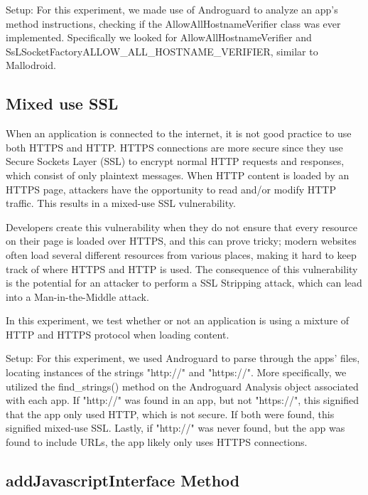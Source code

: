         Setup: For this experiment, we made use of Androguard to analyze an app's 
        method instructions, checking if the AllowAllHostnameVerifier class 
        was ever implemented. Specifically we looked for AllowAllHostnameVerifier and 
        SsLSocketFactory\;\-\>ALLOW\_ALL\_HOSTNAME\_VERIFIER, similar to Mallodroid.


    \subsection{Mixed use SSL}

        When an application is connected to the internet, it is not 
        good practice to use both HTTPS and HTTP. HTTPS connections 
        are more secure since they use Secure Sockets Layer (SSL) to 
        encrypt normal HTTP requests and responses, which consist of 
        only plaintext messages. When HTTP content is loaded by an 
        HTTPS page, attackers have the opportunity to read and/or modify
        HTTP traffic. This results in a mixed-use SSL vulnerability.

        Developers create this vulnerability when they do not ensure 
        that every resource on their page is loaded over HTTPS, and 
        this can prove tricky; modern websites often load several 
        different resources from various places, making it hard to 
        keep track of where HTTPS and HTTP is used. The consequence of this vulnerability 
        is the potential for an attacker to perform a SSL Stripping attack, which can lead into a Man-in-the-Middle 
        attack.

        In this experiment, we test whether or not an application is 
        using a mixture of HTTP and HTTPS protocol when loading content.

        Setup: For this experiment, we used Androguard to parse through the apps' 
        files, locating instances of the strings "http://" and "https://". 
        More specifically, we utilized the find\_strings() method on the Androguard 
        Analysis object associated with each app. If "http://" was found in an app, but not "https://", this signified 
        that the app only used HTTP, which is not secure. If both were found, 
        this signified mixed-use SSL. Lastly, if "http://" was never found, but 
        the app was found to include URLs, the app likely only uses 
        HTTPS connections.

    \subsection{addJavascriptInterface Method}

